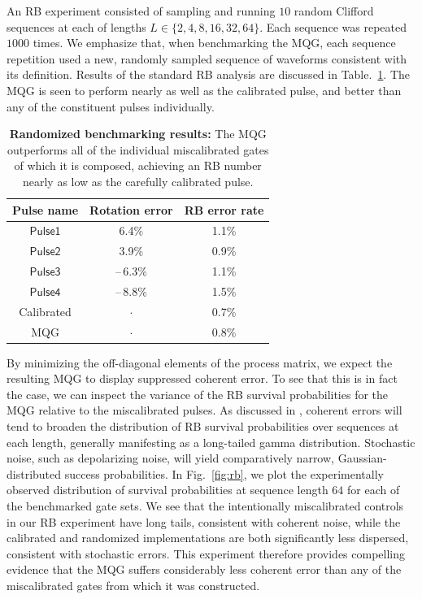 \documentclass[aps,nofootinbib,pra,notitlepage,twocolumn]{revtex4-1}
\newcommand{\0}{\ensuremath{\mathbf{0}}}
\begin{document}
An RB experiment consisted of sampling and running $10$ random Clifford sequences at each of lengths $L\in\{2, 4, 8, 16, 32, 64\}$. Each sequence was repeated $1000$ times. We emphasize that, when benchmarking the MQG, each sequence repetition used a new, randomly sampled sequence of waveforms consistent with its definition. Results of the standard RB analysis are discussed in Table.~\ref{tabl:rb}. The MQG is seen to perform nearly as well as the calibrated pulse, and better than any of the constituent pulses individually. 

\setlength{\tabcolsep}{0.5em} 
{\renewcommand{\arraystretch}{1.2}
\begin{table}[h]
	\centering
	\begin{tabular}{@{}ccc@{}}
		\hline
		Pulse name & Rotation error & RB error rate\\
		\hline
		$\mathsf{Pulse1}$ 	& 6.4\% 	& 1.1\% \\
		$\mathsf{Pulse2}$ 	& 3.9\% 	& 0.9\% \\
		$\mathsf{Pulse3}$ 	& --\,6.3\% 	& 1.1\% \\
		$\mathsf{Pulse4}$ 	& --\,8.8\% 	& 1.5\% \\
		Calibrated 			& $\cdot$  	& 0.7\% \\
		MQG 				& $\cdot$ 	& 0.8\% \\
		\hline
	\end{tabular}
	\caption{\textbf{Randomized benchmarking results:} The MQG outperforms all of the individual miscalibrated gates of which it is composed, achieving an RB number nearly as low as the carefully calibrated pulse. }
\label{tabl:rb}
\end{table}

By minimizing the off-diagonal elements of the process matrix, we expect the resulting MQG to display suppressed coherent error. To see that this is in fact the case, we can inspect the variance of the RB survival probabilities for the MQG relative to the miscalibrated pulses. As discussed in \cite{Ball2016}, coherent errors will tend to broaden the distribution of RB survival probabilities over sequences at each length, generally manifesting as a long-tailed gamma distribution. Stochastic noise, such as depolarizing noise, will yield comparatively narrow, Gaussian-distributed success probabilities. In Fig.~\ref{fig:rb}, we plot the experimentally observed distribution of survival probabilities at sequence length $64$ for each of the benchmarked gate sets. We see that the intentionally miscalibrated controls in our RB experiment have long tails, consistent with coherent noise, while the calibrated and randomized implementations are both significantly less dispersed, consistent with stochastic errors. This experiment therefore provides compelling evidence that the MQG suffers considerably less coherent error than any of the miscalibrated gates from which it was constructed.


}
\end{document}
